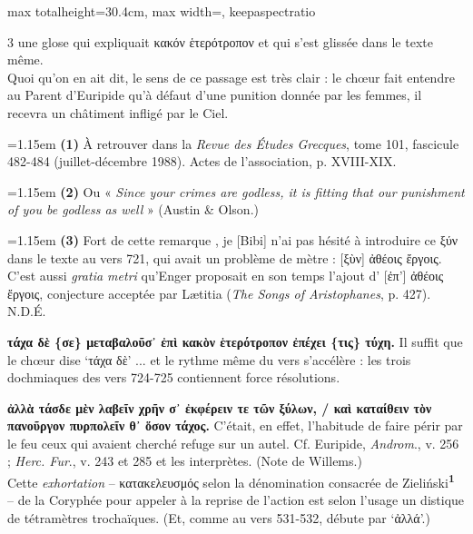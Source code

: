 \documentclass[11pt,twoside]{book}
\newcommand{\italique}[1]{\textit{#1}}
\newcommand{\anglais}[1]{\textit{#1}}
\newcommand{\marqueur}[1]{\textsuperscript{\color{rubricRed}\textbf{#1}}}
\begin{document}
\begin{adjustbox}{max totalheight=30.4cm, max width=\textwidth, keepaspectratio}
\begin{minipage}{\textwidth}
{\begin{multicols}{3}
une glose qui expliquait κακόν ἑτερότροπον et qui s'est glissée dans le texte même. \\ Quoi qu'on en ait dit, le sens de ce passage est très clair : le chœur fait entendre au Parent d'Euripide qu'à défaut d'une punition donnée par les femmes, il recevra un châtiment infligé par le Ciel.
\par\vspace{1.5pt}
\par\vspace{1.2pt}\par\nopagebreak\vspace{1pt}\noindent\hangindent=1.15em {\color{sepiaNote}\textbf{(1)}} À retrouver dans la \italique{Revue des Études Grecques}, tome 101, fascicule 482-484 (juillet-décembre 1988). Actes de l'association, p. XVIII-XIX.
\par\vspace{1.5pt}
\noindent\hangindent=1.15em {\color{sepiaNote}\textbf{(2)}} Ou « \anglais{Since your crimes are godless, it is fitting that our punishment of you be \italique{godless} as well} » (Austin \& Olson.)
\par\vspace{1.5pt}
\noindent\hangindent=1.15em {\color{sepiaNote}\textbf{(3)}} Fort de cette remarque  , je [Bibi] n'ai pas hésité à introduire ce ξύν dans le texte  au vers 721, qui avait un problème de mètre : [ξὺν] ἀθέοις ἔργοις. C'est aussi \italique{gratia metri} qu'Enger proposait en son temps l'ajout d' [ἐπ'] ἀθέοις ἔργοις, conjecture acceptée par Lætitia (\italique{The Songs of Aristophanes}, p. 427). N.D.É.
\par\vspace{1.5pt}
 \textbf{τάχα δὲ \{σε\} μεταβαλοῦσ᾽ ἐπὶ κακὸν ἑτερότροπον ἐπέχει \{τις\} τύχη.} Il suffit que le chœur dise `τάχα δὲ' ... et le rythme même du vers s'accélère : les trois dochmiaques des vers 724-725 contiennent force résolutions.
\par\vspace{1.5pt}
 \textbf{ἀλλὰ τάσδε μὲν λαβεῖν χρῆν σ᾽ ἐκφέρειν τε τῶν ξύλων, / καὶ καταίθειν τὸν πανοῦργον πυρπολεῖν θ᾽ ὅσον τάχος.} C'était, en effet, l'habitude de faire périr par le feu ceux qui avaient cherché refuge sur un autel. Cf. Euripide, \italique{Androm}., v. 256 ; \italique{Herc. Fur}., v. 243 et 285 et les interprètes. (Note de Willems.)\\ Cette \italique{exhortation} -- κατακελευσμός selon la dénomination consacrée de Zieliński\marqueur{1} -- de la Coryphée pour appeler à la reprise de l'action est selon l'usage un distique de tétramètres trochaïques. (Et, comme au vers 531-532, débute par `ἀλλά'.)

\end{multicols}}
\end{minipage}
\end{adjustbox}
\end{document}
